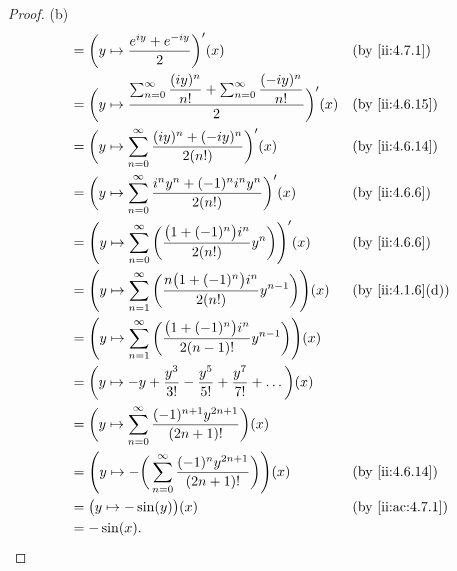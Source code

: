 \begin{proof}{(b)}
\begin{align*}
     & = \bigg(y \mapsto \dfrac{e^{i y} + e^{- i y}}{2}\bigg)'(x)                                                                 &  & \by{ii:4.7.1}    \\
     & = \bigg(y \mapsto \dfrac{\sum_{n = 0}^\infty \dfrac{(i y)^n}{n!} + \sum_{n = 0}^\infty \dfrac{(- i y)^n}{n!}}{2}\bigg)'(x) &  & \by{ii:4.6.15}   \\
     & = \bigg(y \mapsto \sum_{n = 0}^\infty \dfrac{(i y)^n + (- i y)^n}{2 (n!)}\bigg)'(x)                                        &  & \by{ii:4.6.14}   \\
     & = \bigg(y \mapsto \sum_{n = 0}^\infty \dfrac{i^n y^n + (-1)^n i^n y^n}{2 (n!)}\bigg)'(x)                                   &  & \by{ii:4.6.6}    \\
     & = \Bigg(y \mapsto \sum_{n = 0}^\infty \bigg(\dfrac{\big(1 + (-1)^n\big) i^n}{2 (n!)} y^n\bigg)\Bigg)'(x)                   &  & \by{ii:4.6.6}    \\
     & = \Bigg(y \mapsto \sum_{n = 1}^\infty \bigg(\dfrac{n \big(1 + (-1)^n\big) i^n}{2 (n!)} y^{n - 1}\bigg)\Bigg)(x)            &  & \by{ii:4.1.6}[d] \\
     & = \Bigg(y \mapsto \sum_{n = 1}^\infty \bigg(\dfrac{\big(1 + (-1)^n\big) i^n}{2 (n - 1)!} y^{n - 1}\bigg)\Bigg)(x)                                \\
     & = \bigg(y \mapsto -y + \dfrac{y^3}{3!} - \dfrac{y^5}{5!} + \dfrac{y^7}{7!} + \dots\bigg)(x)                                                      \\
     & = \bigg(y \mapsto \sum_{n = 0}^\infty \dfrac{(-1)^{n + 1} y^{2n + 1}}{(2n + 1)!}\bigg)(x)                                                        \\
     & = \Bigg(y \mapsto -\bigg(\sum_{n = 0}^\infty \dfrac{(-1)^n y^{2n + 1}}{(2n + 1)!}\bigg)\Bigg)(x)                           &  & \by{ii:4.6.14}   \\
     & = \big(y \mapsto -\sin(y)\big)(x)                                                                                          &  & \by{ii:ac:4.7.1} \\
     & = -\sin(x).
  \end{align*}
\end{proof}

